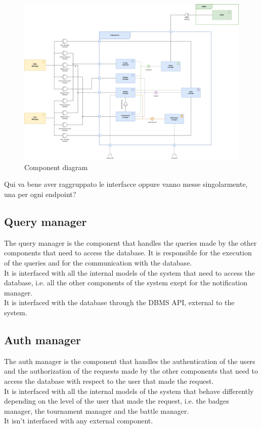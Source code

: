 \begin{figure}[H]
    \centering
    \includegraphics[width=\textwidth]{images/diagrams/component_diagram.png}
    \caption{Component diagram}
\end{figure}

{\color{red}Qui va bene aver raggruppato le interfacce oppure vanno messe singolarmente, una per ogni endpoint?}

\subsection*{Query manager}
The query manager is the component that handles the queries made by the other components that need to access the database. It is responsible for the execution of the queries and for the communication with the database.\\
It is interfaced with all the internal models of the system that need to access the database, i.e. all the other components of the system exept for the notification manager.\\
It is interfaced with the database through the DBMS API, external to the system.\\

\subsection*{Auth manager}
The auth manager is the component that handles the authentication of the users and the authorization of the requests made by the other components that need to access the database with respect to the user that made the request.\\
It is interfaced with all the internal models of the system that behave differently depending on the level of the user that made the request, i.e. the badges manager, the tournament manager and the battle manager.\\
It isn't interfaced with any external component.\\

